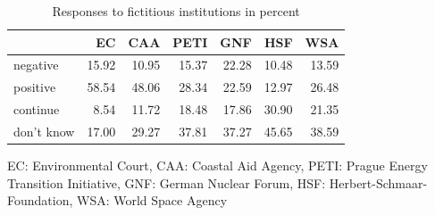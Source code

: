 \documentclass[Royal,times,sageh]{sagej}
\begin{document}
\begin{table}

\begin{threeparttable}
\caption{\label{tab:unnamed-chunk-1}\label{tab:freqs_fi}Responses to fictitious institutions in percent}
\centering
\begin{tabular}[t]{lrrrrrr}
\toprule
  & EC & CAA & PETI & GNF & HSF & WSA\\
\midrule
negative & 15.92 & 10.95 & 15.37 & 22.28 & 10.48 & 13.59\\
positive & 58.54 & 48.06 & 28.34 & 22.59 & 12.97 & 26.48\\
continue & 8.54 & 11.72 & 18.48 & 17.86 & 30.90 & 21.35\\
don't know & 17.00 & 29.27 & 37.81 & 37.27 & 45.65 & 38.59\\
\bottomrule
\end{tabular}
\begin{tablenotes}
\small
\item [] EC: Environmental Court, CAA: Coastal Aid Agency, PETI: Prague Energy Transition Initiative, GNF: German Nuclear Forum, HSF: Herbert-Schmaar-Foundation, WSA: World Space Agency
\end{tablenotes}
\end{threeparttable}
\end{table}
\end{document}
